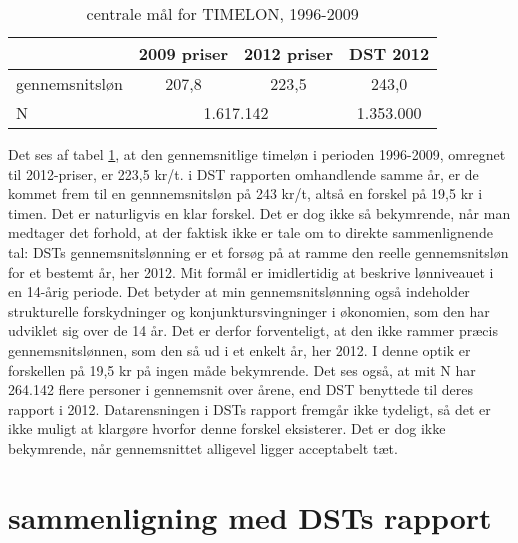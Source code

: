 \begin{table}[H] \centering
\caption{centrale mål for TIMELON, 1996-2009}
\label{app_timeloninf}
\begin{tabular}{@{}lccc@{}} \toprule								
	&	2009 priser	&	2012 priser	&	DST 2012	\\	\midrule
gennemsnitsløn	&	207,8	&	223,5	&	243,0	\\	
N	&	\multicolumn{2}{c}{1.617.142}			&	1.353.000	\\	\bottomrule
\end{tabular}
\end{table}





Det ses af tabel \ref{app_timeloninf}, at den gennemsnitlige timeløn i perioden 1996-2009, omregnet til 2012-priser, er 223,5 kr/t. i DST rapporten omhandlende samme år, er de kommet frem til en gennnemsnitsløn på 243 kr/t, altså en forskel på 19,5 kr i timen. Det er naturligvis en klar forskel. Det er dog ikke så bekymrende, når man medtager det forhold, at der faktisk ikke er tale om to direkte sammenlignende tal: DSTs gennemsnitslønning er et forsøg på at ramme den reelle gennemsnitsløn for et bestemt år, her 2012. Mit formål er imidlertidig at beskrive lønniveauet i en 14-årig periode. Det betyder at min gennemsnitslønning også indeholder strukturelle forskydninger og konjunktursvingninger i økonomien, som den har  udviklet sig over de 14 år. Det er derfor forventeligt, at den ikke rammer præcis gennemsnitslønnen, som den så ud i et enkelt år, her 2012. I denne optik er forskellen på 19,5 kr på ingen måde bekymrende. Det ses også, at mit N har 264.142 flere personer i gennemsnit over årene, end DST benyttede til deres rapport i 2012. Datarensningen i DSTs rapport fremgår ikke tydeligt, så det er ikke muligt at klargøre hvorfor denne forskel eksisterer. Det er dog ikke bekymrende, når gennemsnittet alligevel ligger acceptabelt tæt.  



\section{sammenligning med DSTs rapport \label{app_indkdstrapport}}

